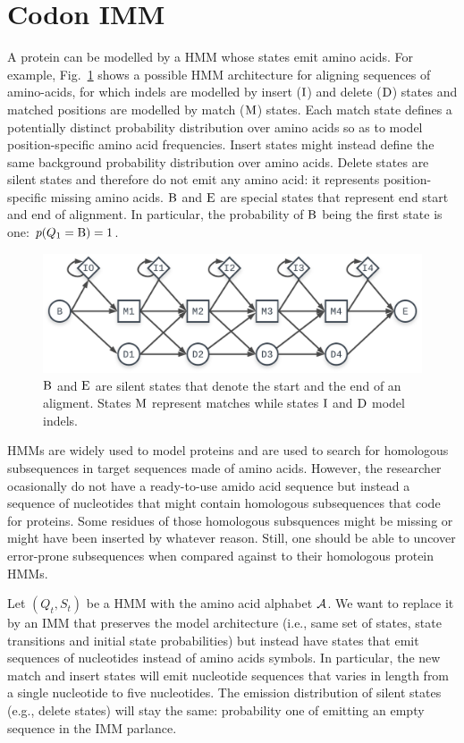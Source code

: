 \section{Codon IMM}

A protein can be modelled by a HMM whose states emit amino acids. For example,
Fig.~\ref{fig:core-model} shows a possible HMM architecture for aligning sequences of amino-acids,
for which indels are modelled by insert ($\mathrm{I}$) and delete ($\mathrm{D}$) states and matched
positions are modelled by match ($\mathrm{M}$) states. Each match state defines a potentially
distinct probability distribution over amino acids so as to model position-specific amino acid
frequencies. Insert states might instead define the same background probability distribution over
amino acids. Delete states are silent states and therefore do not emit any amino acid: it represents
position-specific missing amino acids. $\mathrm{B}$ and $\mathrm{E}$ are special states that represent
end start and end of alignment. In particular, the probability of $\mathrm{B}$ being the first state
is one: $p(Q_1=\mathrm{B})=1$.

\begin{figure}[htbp]
  \centering
  \captionsetup{width=.5\linewidth}
  \includegraphics[width=.5\linewidth]{figure/core-model}
  \caption{$\mathrm{B}$ and $\mathrm{E}$ are silent states that denote the start and the end of an
  aligment. States $\mathrm{M}$ represent matches while states $\mathrm{I}$ and $\mathrm{D}$ model
  indels.}\label{fig:core-model}
\end{figure}

HMMs are widely used to model proteins and are used to search for homologous subsequences in target
sequences made of amino acids. However, the researcher ocasionally do not have a ready-to-use amido
acid sequence but instead a sequence of nucleotides that might contain homologous subsequences that
code for proteins. Some residues of those homologous subsquences might be missing or might have been
inserted by whatever reason. Still, one should be able to uncover error-prone subsequences when
compared against to their homologous protein HMMs.

Let $(Q_t, S_t)$ be a HMM with the amino acid alphabet $\mathcal{A}$. We want to replace it by an IMM
that preserves the model architecture (i.e., same set of states, state transitions and initial state
probabilities) but instead have states that emit sequences of nucleotides instead of amino acids
symbols. In particular, the new match and insert states will emit nucleotide sequences that varies
in length from a single nucleotide to five nucleotides. The emission distribution of silent states
(e.g., delete states) will stay the same: probability one of emitting an empty sequence in the IMM
parlance.

